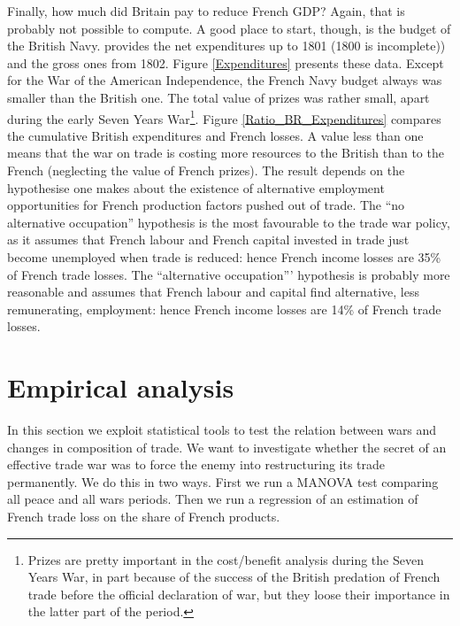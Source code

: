 \documentclass[12pt,a4paper,notitlepage,english]{article}
\begin{document}
Finally, how much did Britain pay to reduce French GDP? Again, that is probably not possible to compute. A good place to start, though, is the budget of the British Navy. \cite[pp. 570-587]{mitchell1988} provides the net expenditures up to 1801 (1800 is incomplete)) and the gross ones from 1802.
Figure \ref{Expenditures} presents these data. Except for the War of the American Independence, the French Navy budget always was smaller than the British one. The total value of prizes was rather small, apart during the early Seven Years War\footnote{Prizes are pretty important in the cost/benefit analysis during the Seven Years War, in part because of the success of the British predation of French trade before the official declaration of war, but they loose their importance in the latter part of the period.}.
Figure \ref{Ratio_BR_Expenditures} compares the cumulative British expenditures and French losses. A value less than one means that the war on trade is costing more resources to the British than to the French (neglecting the value of French prizes). 
The result depends on the hypothesise one makes about the existence of alternative employment opportunities for French production factors pushed out of trade. The ``no alternative occupation'' hypothesis is the most favourable to the trade war policy, as it assumes that French labour and French capital invested in trade just become unemployed when trade is reduced: hence French income losses are 35\% of French trade losses. The ``alternative occupation''' hypothesis is probably more reasonable and assumes that French labour and capital find alternative, less remunerating, employment: hence French income losses are 14\% of French trade losses.

\section{Empirical analysis} \label{sec:empirical_analysis}
In this section we exploit statistical tools to test the relation between wars and changes in composition of trade. We want to investigate whether the secret of an effective trade war was to force the enemy into restructuring its trade permanently. We do this in two ways. First we run a MANOVA test comparing all peace and all wars periods. Then we run a regression of an estimation of French trade loss on the share of French products.
\end{document}
